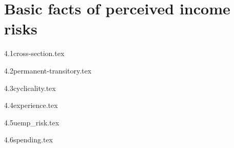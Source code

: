 \hypertarget{perceived-income-risks-basic-facts}{%
\section{Basic
facts of perceived income risks}\label{perceived-income-risks-basic-facts}}


{4.1cross-section.tex}


{4.2permanent-transitory.tex}

{4.3cyclicality.tex}

{4.4experience.tex}

{4.5uemp_risk.tex}

{4.6spending.tex}

